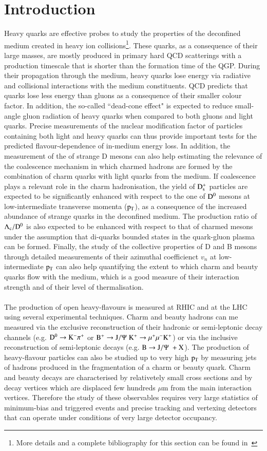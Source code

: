 \documentclass{webofc}
\begin{document}
\section{Introduction}
\label{intro}
Heavy quarks are effective probes to study the properties of the deconfined medium created in heavy ion collisions\footnote{More details and a complete bibliography for this section can 
be found in~\cite{saporegravis}}. These quarks, as a consequence of their large masses, are mostly produced in primary hard QCD scatterings with a production 
timescale that is shorter than the formation time of the QGP. During their propagation through the medium, heavy quarks lose energy via radiative and collisional 
interactions with the medium constituents. QCD predicts that quarks lose less energy than gluons as a consequence of their smaller colour factor. 
In addition, the so-called ``dead-cone effect" is expected to reduce small-angle gluon radiation of heavy quarks when compared to both 
gluons and light quarks. Precise measurements of the nuclear modification factor \raa of particles containing both light and heavy quarks can thus 
provide important tests for the predicted flavour-dependence of in-medium energy loss. In addition, the measurement of the \raa of strange D mesons 
can also help estimating the relevance of the coalescence mechanism in which charmed hadrons are formed 
by the combination of charm quarks with light quarks from the medium. If coalescence plays a relevant role in the charm hadronisation, 
the yield of $\rm D_{s}^{+}$ particles are expected to be significantly enhanced with respect to the one of $\rm D^{0}$ mesons at low-intermediate transverse momenta ($\rm p_{\rm T} $), 
as a consequence of the increased abundance of strange quarks in the deconfined medium. The production ratio of $\rm \Lambda_{c}/\rm D^{0}$ 
is also expected to be enhanced with respect to that of charmed mesons under the assumption that di-quarks bounded states in the 
quark-gluon plasma can be formed. Finally, the study of the collective properties of D and B mesons through detailed measurements of their azimuthal coefficienct $v_{n}$ 
at low-intermediate $\rm p_{\rm T} $ can also help quantifying the extent to which charm and beauty quarks flow with the medium, 
which is a good measure of their interaction strength and  of their level of thermalisation.
\\ \\
The production of open heavy-flavours is measured at RHIC and at the LHC using several experimental techniques. Charm and beauty hadrons can me measured via the exclusive reconstruction 
of their hadronic or semi-leptonic decay channels (e.g. $\rm D^{0} \rightarrow K^{-} \pi^{+}$ or $\rm \rm B^{+} \rightarrow J/\Psi \hspace{0.1cm} K^{+} \rightarrow \mu^{+} \mu^{-} K^{+}$) or via the inclusive reconstruction of semi-leptonic decays (e.g. $\rm B \rightarrow J/\Psi \hspace{0.1cm}+ X$). The production of 
heavy-flavour particles can also be studied up to very high $\rm p_{\rm T} $ by measuring jets of hadrons produced in the fragmentation of a charm or beauty quark.  Charm and beauty decays are 
characterised by relativetely small cross sections and by decay vertices which are displaced few hundreds $\mu$m from the main interaction vertices.
Therefore the study of these observables requires very large statistics of minimum-bias and triggered events 
and precise tracking and vertexing detectors that can operate under conditions of very large detector occupancy. 
\end{document}
